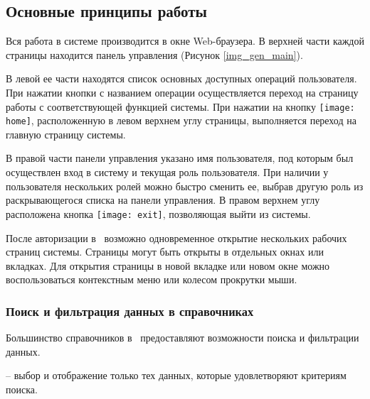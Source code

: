 \subsection{Основные принципы работы}

Вся работа в системе производится в окне Web-браузера. В верхней части каждой страницы находится панель управления (Рисунок \ref{img_gen_main}).

В левой ее части находятся список основных доступных операций пользователя. При нажатии кнопки с названием операции осуществляется переход на страницу работы с соответствующей функцией системы. При нажатии на кнопку \texttt{[image: home]}, расположенную в левом верхнем углу страницы, выполняется переход на главную страницу системы.

В правой части панели управления указано имя пользователя, под которым был осуществлен вход в систему и текущая роль пользователя. При наличии у пользователя нескольких ролей можно быстро сменить ее, выбрав другую роль из раскрывающегося списка на панели управления. В правом верхнем углу расположена кнопка \texttt{[image: exit]}, позволяющая выйти из системы.

\begin{prim}
 После авторизации в \tmis~возможно одновременное открытие нескольких рабочих страниц системы. Страницы могут быть открыты в отдельных окнах или вкладках. Для открытия страницы в новой вкладке или новом окне можно воспользоваться контекстным меню или колесом прокрутки мыши.
\end{prim}

\subsubsection{Поиск и фильтрация данных в справочниках} \label{gen_filtr}

Большинство справочников в \tmis~предоставляют возможности поиска и фильтрации данных.

 -- выбор и отображение только тех данных, которые удовлетворяют критериям поиска.

